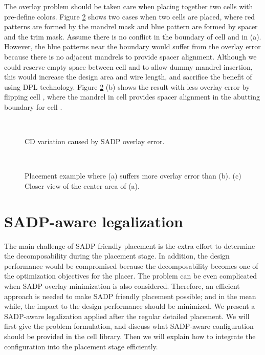 The overlay problem should be taken care when placing together two cells with pre-define colors. Figure \ref{fig:overlay_ex} shows two cases when two cells are placed, where red patterns are formed by the mandrel mask and blue pattern are formed by spacer and the trim mask. Assume there is no conflict in the boundary of cell  and  in (a). However, the blue patterns near the boundary would suffer from the overlay error because there is no adjacent mandrels to provide spacer alignment. Although we could reserve empty space between cell  and  to allow dummy mandrel insertion, this would increase the design area and wire length, and sacrifice the benefit of using DPL technology. Figure \ref{fig:overlay_ex} (b) shows the result with less overlay error by flipping cell , where the mandrel in cell  provides spacer alignment in the abutting boundary for cell . 

\begin{figure}[h]
\centering
\mbox{
\hspace{0.20in}
}
\caption{CD variation caused by SADP overlay error.}
  \label{fig:sadp_ov}
\end{figure}

\begin{figure}[h]
\centering
\mbox{
\hspace{0.20in}
\hspace{0.20in}
}
\caption{Placement example where (a) suffers more overlay error than (b). (c) Closer view of the center area of (a).}
  \label{fig:overlay_ex}
\end{figure}

\section{SADP-aware legalization} \label{sec:method_lut}
The main challenge of SADP friendly placement is the extra effort to determine the decomposability during the placement stage. In addition, the design performance would be compromised because the decomposability becomes one of the optimization objectives for the placer. The problem can be even complicated when SADP overlay minimization is also considered. Therefore, an efficient approach is needed to make SADP friendly placement possible; and in the mean while, the impact to the design performance should be minimized. We present a SADP-aware legalization applied after the regular detailed placement. We will first give the problem formulation, and discuss what SADP-aware configuration should be provided in the cell library. Then we will explain how to integrate the configuration into the placement stage efficiently.

